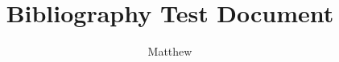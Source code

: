 \documentclass[12pt]{article}
\title{Bibliography Test Document}
\author{Matthew}
\begin{document}
	\maketitle
	\nocite{*}
	\printbibliography
\end{document}
